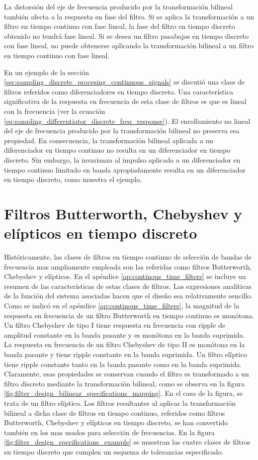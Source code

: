 \documentclass[a4paper]{report}
\begin{document}
La distorsión del eje de frecuencia producido por la transformación bilineal también afecta a la respuesta en fase del filtro. Si se aplica la transformación a un filtro en tiempo continuo con fase lineal, la fase del filtro en tiempo discreto obtenido no tendrá fase lineal. Si se desea un filtro pasabajos en tiempo discreto con fase lineal, no puede obtenerse aplicando la transformación bilineal a un filtro en tiempo continuo con fase lineal. 

En un ejemplo de la sección \ref{sec:sampling_discrete_procesing_continuous_signals} se discutió una clase de filtros referidos como diferenciadores en tiempo discreto. Una característica significativa de la respuesta en frecuencia de esta clase de filtros es que es lineal con la frecuencia (ver la ecuación \ref{eq:sampling_differentiator_discrete_freq_response}). El enrollamiento no lineal del eje de frecuencia producido por la transformación bilineal no preserva esa propiedad. En consecuencia, la transformación bilineal aplicada a un diferenciador en tiempo continuo no resulta en un diferenciador en tiempo discreto. Sin embargo, la invarianza al impulso aplicada a un diferenciador en tiempo continuo limitado en banda apropiadamente resulta en un diferenciador en tiempo discreto, como muestra el ejemplo.

\section{Filtros Butterworth, Chebyshev y elípticos en tiempo discreto}\label{sec:filter_design_butter_chevy_ellip_discrete}

Históricamente, las clases de filtros en tiempo continuo de selección de bandas de frecuencia mas ampliamente empleada son las referidas como filtros Butterworth, Chebyshev y elípticos. En el apéndice \ref{ap:continous_time_filters} se incluye un resumen de las características de estas clases de filtros. Las expresiones analíticas de la función del sistema asociadas hacen que el diseño sea relativamente sencillo. Como se indicó en el apéndice \ref{ap:continous_time_filters}, la magnitud de la respuesta en frecuencia de un filtro Butterworth en tiempo continuo es monótona. Un filtro Chebyshev de tipo I tiene respuesta en frecuencia con ripple de amplitud constante en la banda pasante y es monótona en la banda suprimida. La respuesta en frecuencia de un filtro Chebyshev de tipo II es monótona en la banda pasante y tiene ripple constante en la banda suprimida. Un filtro elíptico tiene ripple constante tanto en la banda pasante como en la banda suprimida. Claramente, esas propiedades se conservan cuando el filtro es transformado a un filtro discreto mediante la transformación bilineal, como se observa en la figura \ref{fig:filter_design_bilinear_specifications_mapping}. En el caso de la figura, se trata de un filtro elíptico. 
Los filtros resultantes al aplicar la transformación bilineal a dicha clase de filtros en tiempo continuo, referidos como filtros Butterworth, Chebyshev y elípticos en tiempo discreto, se han convertido también en los mas usados para selección de frecuencias. En la figura \ref{fig:filter_design_specifications_example} se muestran las cuatro clases de filtros en tiempo discreto que cumplen un esquema de tolerancias especificado.
\end{document}
